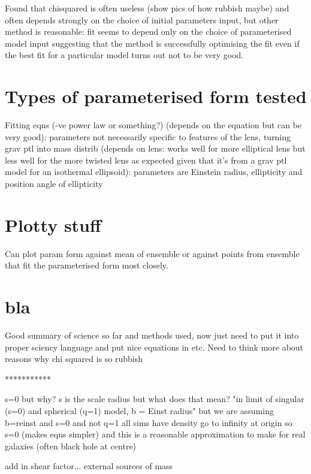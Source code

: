 \documentclass{article}
\begin{document}
Found that chisquared is often useless (show pics of how rubbish maybe) and often depends strongly on the choice of initial parameters input, but other method is reasonable: fit seems to depend only on the choice of parameterised model input suggesting that the method is successfully optimising the fit even if the best fit for a particular model turns out not to be very good.

\section{Types of parameterised form tested}
Fitting eqns (-ve power law or something?) (depends on the equation but can be very good): parameters not necessarily specific to features of the lens, 
turning grav ptl into mass distrib (depends on lens: works well for more elliptical lens but less well for the more twisted lens as expected given that it's from a grav ptl model for an isothermal ellipsoid): parameters are Einstein radius, ellipticity and position angle of ellipticity

\section{Plotty stuff}
Can plot param form against mean of ensemble or against points from ensemble that fit the parameterised form most closely.


\section{bla}
Good summary of science so far and methods used, now just need to put it into proper sciency language and put nice equations in etc. Need to think more about reasons why chi squared is so rubbish

***********


s=0 but why? s is the scale radius but what does that mean?
"in limit of singular (s=0) and spherical (q=1) model, b = Einst radius"
but we are assuming b=reinst and s=0 and not q=1
    all sims have density go to infinity at origin so s=0 (makes eqns simpler) and this is a reasonable approximation to make for real galaxies (often black hole at centre)
    

add in shear factor... external sources of mass
\end{document}
